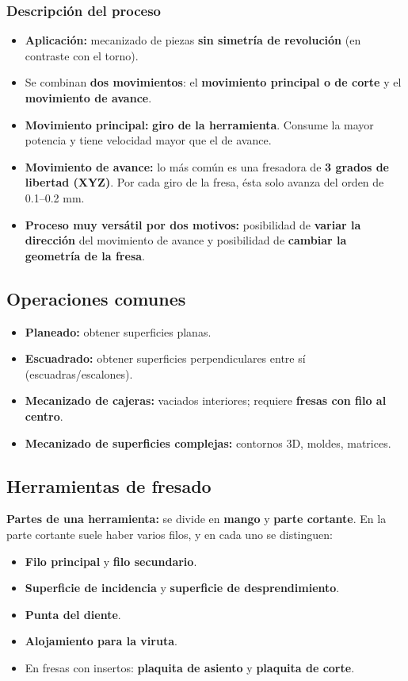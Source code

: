 \documentclass[12pt,a4paper]{article}
\begin{document}
\subsubsection{Descripción del proceso}
\begin{itemize}
	\item \textbf{Aplicación:} mecanizado de piezas \textbf{sin simetría de
		      revolución} (en contraste con el torno).
	\item Se combinan \textbf{dos movimientos}: el \textbf{movimiento principal o
		      de corte} y el \textbf{movimiento de avance}.
	\item \textbf{Movimiento principal:} \textbf{giro de la herramienta}. Consume
	      la mayor potencia y tiene velocidad mayor que el de avance.
	\item \textbf{Movimiento de avance:} lo más común es una fresadora de
	      \textbf{3 grados de libertad (XYZ)}. Por cada giro de la fresa, ésta
	      solo avanza
	      del orden de 0.1--0.2 mm.
	\item \textbf{Proceso muy versátil por dos motivos:} posibilidad de
	      \textbf{variar la dirección} del movimiento de avance y posibilidad de
	      \textbf{cambiar la geometría de la fresa}.
\end{itemize}

\subsection{Operaciones comunes}
\begin{itemize}
	\item \textbf{Planeado:} obtener superficies planas.
	\item \textbf{Escuadrado:} obtener superficies perpendiculares entre sí
	      (escuadras/escalones).
	\item \textbf{Mecanizado de cajeras:} vaciados interiores; requiere
	      \textbf{fresas con filo al centro}.
	\item \textbf{Mecanizado de superficies complejas:} contornos 3D, moldes,
	      matrices.
\end{itemize}

\subsection{Herramientas de fresado}
\textbf{Partes de una herramienta:} se divide en \textbf{mango} y \textbf{parte
	cortante}. En la parte cortante suele haber varios filos, y en cada uno se
distinguen:
\begin{itemize}
	\item \textbf{Filo principal} y \textbf{filo secundario}.
	\item \textbf{Superficie de incidencia} y \textbf{superficie de
		      desprendimiento}.
	\item \textbf{Punta del diente}.
	\item \textbf{Alojamiento para la viruta}.
	\item En fresas con insertos: \textbf{plaquita de asiento} y \textbf{plaquita
		      de corte}.
\end{itemize}
\end{document}
